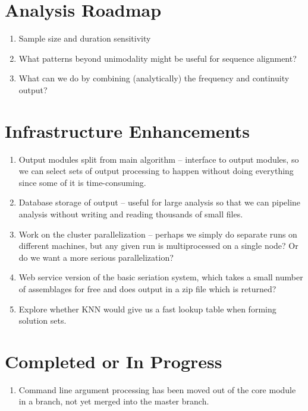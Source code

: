 \documentclass[preprint,times,authoryear,10pt]{elsarticle}
\begin{document}
\section{Analysis Roadmap}\label{analysis-roadmap}

\begin{enumerate}
\def\labelenumi{\arabic{enumi}.}
\itemsep1pt\parskip0pt
\item
  Sample size and duration sensitivity
\item
  What patterns beyond unimodality might be useful for sequence
  alignment?\\
\item
  What can we do by combining (analytically) the frequency and
  continuity output?
\end{enumerate}

\section{Infrastructure Enhancements}\label{infrastructure-enhancements}

\begin{enumerate}
\def\labelenumi{\arabic{enumi}.}
\itemsep1pt\parskip0pt
\item
  Output modules split from main algorithm -- interface to output
  modules, so we can select sets of output processing to happen without
  doing everything since some of it is time-consuming.
\item
  Database storage of output -- useful for large analysis so that we can
  pipeline analysis without writing and reading thousands of small
  files.
\item
  Work on the cluster parallelization -- perhaps we simply do separate
  runs on different machines, but any given run is multiprocessed on a
  single node? Or do we want a more serious parallelization?\\
\item
  Web service version of the basic seriation system, which takes a small
  number of assemblages for free and does output in a zip file which is
  returned?
\item
  Explore whether KNN would give us a fast lookup table when forming
  solution sets.
\end{enumerate}

\section{Completed or In Progress}\label{completed-or-in-progress}

\begin{enumerate}
\def\labelenumi{\arabic{enumi}.}
\itemsep1pt\parskip0pt
\item
  Command line argument processing has been moved out of the core module
  in a branch, not yet merged into the master branch.
\end{enumerate}





\end{document}
